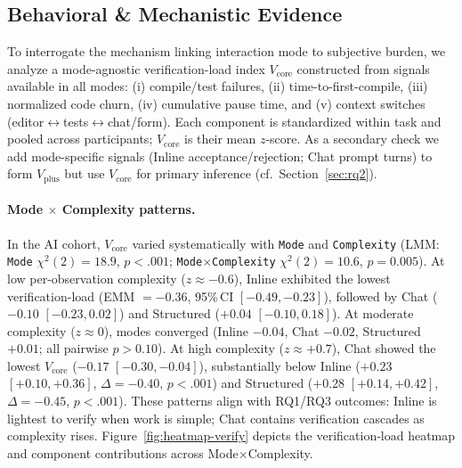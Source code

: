 \documentclass[sigconf]{acmart}
\begin{document}
\subsection{Behavioral \& Mechanistic Evidence}
\label{sec:mechanism}

To interrogate the mechanism linking interaction mode to subjective burden, we analyze a mode-agnostic verification-load index $V_{\text{core}}$ constructed from signals available in all modes: (i) compile/test failures, (ii) time-to-first-compile, (iii) normalized code churn, (iv) cumulative pause time, and (v) context switches (editor$\leftrightarrow$\allowbreak{}tests$\leftrightarrow$\allowbreak{}chat/form). Each component is standardized within task and pooled across participants; $V_{\text{core}}$ is their mean $z$-score. As a secondary check we add mode-specific signals (Inline acceptance/rejection; Chat prompt turns) to form $V_{\text{plus}}$ but use $V_{\text{core}}$ for primary inference (cf.\ Section~\ref{sec:rq2}).

\paragraph{Mode $\times$ Complexity patterns.}
In the AI cohort, $V_{\text{core}}$ varied systematically with \texttt{Mode} and \texttt{Complexity} (LMM: \texttt{Mode} $\chi^2(2){=}18.9$, $p{<}.001$; \texttt{Mode$\times$Complexity} $\chi^2(2){=}10.6$, $p{=}0.005$). At low per\hyp{}observation complexity ($z{\approx}{-}0.6$), Inline exhibited the lowest verification-load (EMM $={-}0.36$, 95\%\,CI $[{-}0.49, {-}0.23]$), followed by Chat ($-0.10$ $[{-}0.23, 0.02]$) and Structured ($+0.04$ $[{-}0.10, 0.18]$). At moderate complexity ($z{\approx}0$), modes converged (Inline $-0.04$, Chat $-0.02$, Structured $+0.01$; all pairwise $p{>}0.10$). At high complexity ($z{\approx}{+}0.7$), Chat showed the lowest $V_{\text{core}}$ ($-0.17$ $[{-}0.30, {-}0.04]$), substantially below Inline ($+0.23$ $[+0.10, +0.36]$, $\Delta{=}{-}0.40$, $p{<}.001$) and Structured ($+0.28$ $[+0.14, +0.42]$, $\Delta{=}{-}0.45$, $p{<}.001$). These patterns align with RQ1/RQ3 outcomes: Inline is lightest to verify when work is simple; Chat contains verification cascades as complexity rises. Figure~\ref{fig:heatmap-verify} depicts the verification‑load heatmap and component contributions across Mode$\times$Complexity.
\end{document}
